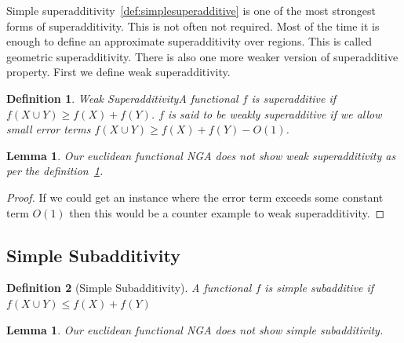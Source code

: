 \documentclass{article}
\theoremstyle{define}
\newtheorem{define}{Definition}[section]
\newtheorem{lemma}[theorem]{Lemma}
\theoremstyle{remark}
\begin{document}
Simple superadditivity~\ref{def:simplesuperadditive} is one of the most strongest forms of
superadditivity. This is not often not required. Most of the time it is enough
to define an approximate superadditivity over regions. This is called geometric
superadditivity. There is also one more weaker version of superadditive
property. First we define weak superadditivity.

\begin{define}{Weak Superadditivity}\label{def:weaksuperadditive}
    A functional $f$ is superadditive if $f(X \cup Y) \ge f(X) + f(Y) $.
    $f$ is said to be weakly superadditive if we allow small error terms
    $f(X \cup Y) \ge f(X) + f(Y) - O(1)$.
\end{define}

\begin{lemma}
    Our euclidean functional \textsf{NGA} does not show weak superadditivity as per the definition~\ref{def:weaksuperadditive}.
\end{lemma}

\begin{proof}
    If we could get an instance where the error term exceeds some constant term $O(1)$
    then this would be a counter example to weak superadditivity.
\end{proof}




\subsection{Simple Subadditivity}
\begin{define}[Simple Subadditivity]
    \textit{A functional $f$ is simple subadditive if $f(X \cup Y) \leq f(X) + f(Y)$}
\end{define}

\vspace{0.5em}

\begin{lemma}
    Our euclidean functional \textsf{NGA} does not show simple subadditivity.
\end{lemma}
\end{document}
